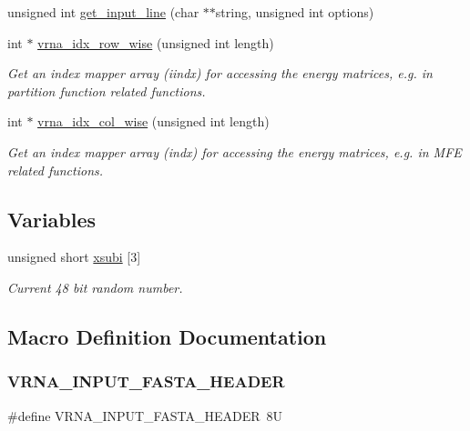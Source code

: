 \begin{DoxyCompactItemize}
unsigned int \hyperlink{group__utils_ga8ef1835eb83f542396f59f0b205965e5}{get\+\_\+input\+\_\+line} (char $\ast$$\ast$string, unsigned int options)
\item 
int $\ast$ \hyperlink{group__utils_ga70b180e9ea764218a82647a1cd347445}{vrna\+\_\+idx\+\_\+row\+\_\+wise} (unsigned int length)
\begin{DoxyCompactList}\small\item\em Get an index mapper array (iindx) for accessing the energy matrices, e.\+g. in partition function related functions. \end{DoxyCompactList}\item 
int $\ast$ \hyperlink{group__utils_ga89ebc69c52fa0c78c9e1974b0017746b}{vrna\+\_\+idx\+\_\+col\+\_\+wise} (unsigned int length)
\begin{DoxyCompactList}\small\item\em Get an index mapper array (indx) for accessing the energy matrices, e.\+g. in M\+FE related functions. \end{DoxyCompactList}\end{DoxyCompactItemize}
\subsection*{Variables}
\begin{DoxyCompactItemize}
\item 
unsigned short \hyperlink{group__utils_gaf9a866c8417afda7368bbac939ab3c47}{xsubi} \mbox{[}3\mbox{]}
\begin{DoxyCompactList}\small\item\em Current 48 bit random number. \end{DoxyCompactList}\end{DoxyCompactItemize}


\subsection{Macro Definition Documentation}
\mbox{\label{group__utils_ga2f0d8069e93d3ac54d9320d6bdb8e7e7}} 
\subsubsection{\texorpdfstring{V\+R\+N\+A\+\_\+\+I\+N\+P\+U\+T\+\_\+\+F\+A\+S\+T\+A\+\_\+\+H\+E\+A\+D\+ER}{VRNA\_INPUT\_FASTA\_HEADER}}
{\footnotesize\ttfamily \#define V\+R\+N\+A\+\_\+\+I\+N\+P\+U\+T\+\_\+\+F\+A\+S\+T\+A\+\_\+\+H\+E\+A\+D\+ER~8U}




